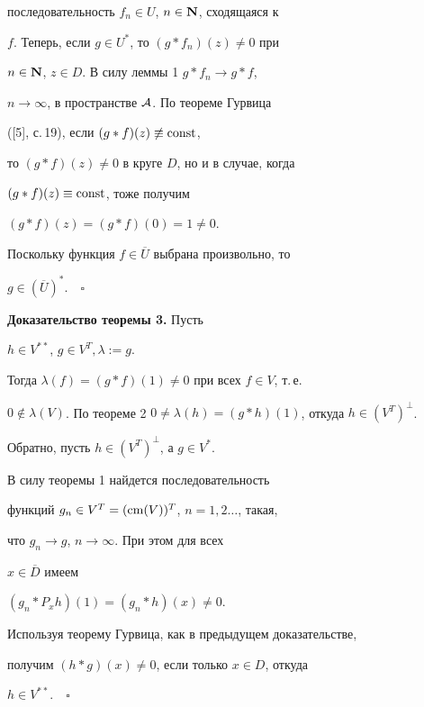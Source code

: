 последовательность $f_n \in U$, $n \in \bold N$, сходящаяся к 


$f$. Теперь, если $g\in U^*$, то $(g*f_n )(z) \neq 0$ при 


$n\in \bold N$, $z\in D$. В силу леммы 1\; $g*f_n \to g*f$, 


$n \to \infty$, в пространстве ${\cal A}$. По теореме Гурвица 


([5], с.\,19), если $(g*f)(z) \not\equiv \operatorname{const}$, 


то $(g*f)(z) \neq 0$ в круге $D$, но и в случае, когда 


$(g*f)(z) \equiv \operatorname{const}$, тоже получим 


$(g*f)(z) = (g*f)(0)= 1 \neq 0$. 


Поскольку функция $f\in \overline{U}$ выбрана произвольно, то 


$g\in (\overline{U})^*.\quad\square$


\medskip





{\bf Доказательство теоремы 3.} Пусть 


$h\in V ^{**}$, $g \in V^T, \lambda:=g$. 


Тогда $\lambda(f)=(g*f)(1){\neq}0$ при всех $f\in V$, т.\,е. 


$0 \notin \lambda(V)$. По теореме 2\; $0 \neq \lambda(h)= 


(g*h)(1)$, откуда $h\in (V^T)^{\perp}$. 


Обратно, пусть $h\in (V^T)^{\perp}$, а $g\in V^*$. 


В силу теоремы 1 найдется последовательность 


функций $g_n \in V^T =(\operatorname{cm} (V))^T$, $n=1,2\dotsc$, такая, 


что $g_n \to g$, $n \to\infty$. При этом для всех 


$x \in \overline{D}$ имеем 


$(g_n *P_x h)(1)= (g_n *h)(x) \neq 0$. 


Используя теорему Гурвица, как в предыдущем доказательстве, 


получим $(h*g)(x) \neq 0$, если только $x\in D$, откуда


$h\in V^{**}.\quad\square$ 





